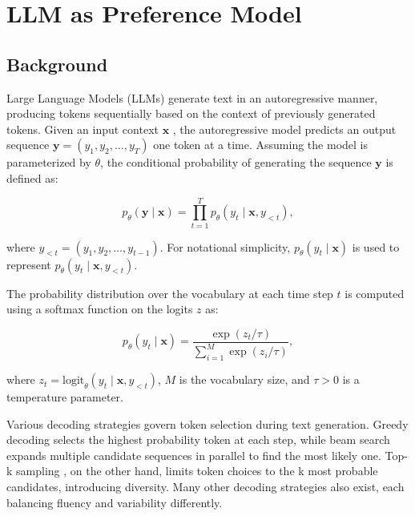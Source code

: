 \section{LLM as Preference Model}
\label{LLM_as_Preference}
\subsection{Background}

Large Language Models (LLMs) generate text in an autoregressive manner, producing tokens sequentially based on the context of previously generated tokens. Given an input context \( \mathbf{x} \) , the autoregressive model predicts an output sequence \( \mathbf{y} = (y_1, y_2, \dots, y_T) \) one token at a time. Assuming the model is parameterized by \( \theta \), the conditional probability of generating the sequence \( \mathbf{y} \) is defined as:

\begin{equation}
    p_\theta(\mathbf{y} \mid \mathbf{x}) = \prod_{t=1}^T p_\theta(y_t \mid \mathbf{x}, y_{<t}),
\end{equation}

where \( y_{<t} = (y_1, y_2, \dots, y_{t-1}) \). For notational simplicity, \( p_\theta(y_t \mid \mathbf{x}) \) is used to represent \( p_\theta(y_t \mid \mathbf{x}, y_{<t}) \).

The probability distribution over the vocabulary at each time step \( t \) is computed using a softmax function on the logits \( z \) as:

\begin{equation}
    p_\theta(y_t \mid \mathbf{x}) = \frac{\exp(z_t / \tau)}{\sum_{i=1}^M \exp(z_i / \tau)},
\end{equation}

where \( z_t = \text{logit}_\theta(y_t \mid \mathbf{x}, y_{<t}) \), \( M \) is the vocabulary size, and \( \tau > 0 \) is a temperature parameter. 

Various decoding strategies govern token selection during text generation. Greedy decoding selects the highest probability token at each step, while beam search expands multiple candidate sequences in parallel to find the most likely one. Top-k sampling \citep{fan2018hierarchical}, on the other hand, limits token choices to the k most probable candidates, introducing diversity. Many other decoding strategies also exist, each balancing fluency and variability differently.




